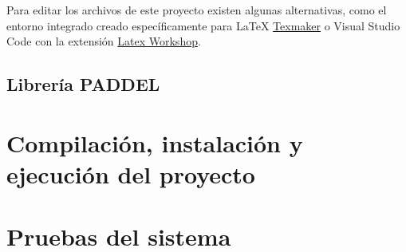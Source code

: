 Para editar los archivos de este proyecto existen algunas alternativas, como el
entorno integrado creado específicamente para \LaTeX{}
\href{https://www.xm1math.net/texmaker/}{Texmaker} o Visual Studio Code con la
extensión
\href{https://marketplace.visualstudio.com/items?itemName=James-Yu.latex-workshop}{Latex
    Workshop}.

\subsection{Librería PADDEL}

\section{Compilación, instalación y ejecución del proyecto}


\section{Pruebas del sistema}
